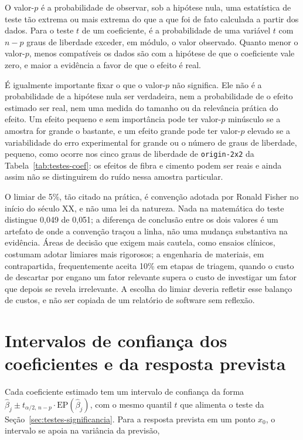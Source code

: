 \documentclass{doeapostila}
\begin{document}
O valor-$p$ é a probabilidade de observar, sob a hipótese nula, uma
estatística de teste tão extrema ou mais extrema do que a que foi de fato
calculada a partir dos dados. Para o teste $t$ de um coeficiente, é a
probabilidade de uma variável $t$ com $n-p$ graus de liberdade exceder, em
módulo, o valor observado. Quanto menor o valor-$p$, menos compatíveis os
dados são com a hipótese de que o coeficiente vale zero, e maior a
evidência a favor de que o efeito é real.

É igualmente importante fixar o que o valor-$p$ não significa. Ele não é a
probabilidade de a hipótese nula ser verdadeira, nem a probabilidade de o
efeito estimado ser real, nem uma medida do tamanho ou da relevância
prática do efeito. Um efeito pequeno e sem importância pode ter valor-$p$
minúsculo se a amostra for grande o bastante, e um efeito grande pode ter
valor-$p$ elevado se a variabilidade do erro experimental for grande ou o
número de graus de liberdade, pequeno, como ocorre nos cinco graus de
liberdade de \texttt{origin-2x2} da Tabela~\ref{tab:testes-coef}: os
efeitos de fibra e cimento podem ser reais e ainda assim não se
distinguirem do ruído nessa amostra particular.

O limiar de 5\%, tão citado na prática, é convenção adotada por Ronald
Fisher no início do século XX, e não uma lei da natureza. Nada na
matemática do teste distingue 0{,}049 de 0{,}051; a diferença de conclusão
entre os dois valores é um artefato de onde a convenção traçou a linha, não
uma mudança substantiva na evidência. Áreas de decisão que exigem mais
cautela, como ensaios clínicos, costumam adotar limiares mais rigorosos; a
engenharia de materiais, em contrapartida, frequentemente aceita 10\% em
etapas de triagem, quando o custo de descartar por engano um fator
relevante supera o custo de investigar um fator que depois se revela
irrelevante. A escolha do limiar deveria refletir esse balanço de custos, e
não ser copiada de um relatório de software sem reflexão.

\section{Intervalos de confiança dos coeficientes e da resposta prevista}

Cada coeficiente estimado tem um intervalo de confiança da forma
$\hat{\beta}_j \pm t_{\alpha/2,\,n-p}\cdot \mathrm{EP}(\hat{\beta}_j)$, com
o mesmo quantil $t$ que alimenta o teste da Seção~\ref{sec:testes-significancia}.
Para a resposta prevista em um ponto $x_0$, o intervalo se apoia na
variância da previsão,
\end{document}
